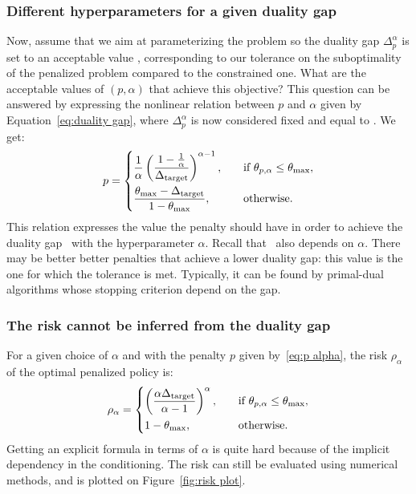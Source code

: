 \subsubsection{Different hyperparameters for a given duality gap}
Now, assume that we aim at parameterizing the problem so the duality gap $\Delta_p^\alpha$ is set to an acceptable value \Deltatarget, corresponding to our tolerance on the suboptimality of the penalized problem compared to the constrained one. What are the acceptable values of $(p, \alpha)$ that achieve this objective? This question can be answered by expressing the nonlinear relation between $p$ and $\alpha$ given by Equation~\ref{eq:duality gap}, where $\Delta_p^\alpha$ is now considered fixed and equal to \Deltatarget. We get:
\begin{equation}
	p = \begin{dcases}
		\frac{1}{\alpha}\left(\frac{1 - \frac{1}{\alpha}}{\Delta_\text{target}}\right)^{\alpha - 1},&\quad\text{if}~\theta_{p, \alpha}\leq\theta_\text{max},\\
		\frac{\theta_\text{max} - \Delta_\text{target}}{1 - \theta_\text{max}},&\quad\text{otherwise}.
	\end{dcases}\label{eq:p alpha}
\end{equation}
This relation expresses the value the penalty should have in order to achieve the duality gap \Deltatarget~with the hyperparameter $\alpha$. Recall that \thetamax~also depends on $\alpha$. There may be better better penalties that achieve a lower duality gap: this value is the one for which the tolerance is met. Typically, it can be found by primal-dual algorithms whose stopping criterion depend on the gap.

\subsubsection{The risk cannot be inferred from the duality gap}
For a given choice of $\alpha$ and with the penalty $p$ given by~\eqref{eq:p alpha}, the risk $\rho_{\alpha}$ of the optimal penalized policy is:
\begin{equation}
	\rho_{\alpha} = \begin{dcases}
		\left(\frac{\alpha\Delta_\text{target}}{\alpha - 1}\right)^\alpha,& \quad\text{if}~\theta_{p, \alpha}\leq\theta_\text{max},\\
		1 - \theta_\text{max},&\quad\text{otherwise}.
	\end{dcases} \label{eq:risk alpha}
\end{equation}
Getting an explicit formula in terms of $\alpha$ is quite hard because of the implicit dependency in the conditioning. The risk can still be evaluated using numerical methods, and is plotted on Figure~\ref{fig:risk plot}. 
